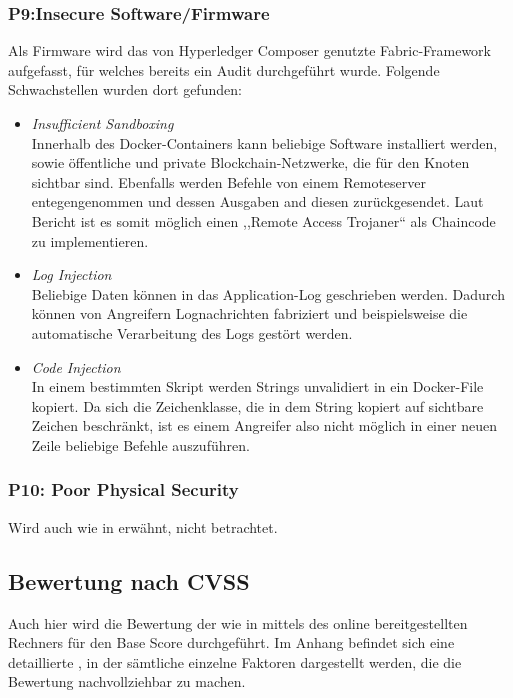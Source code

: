         \subsubsection*{P9:Insecure Software/Firmware}
            Als Firmware wird das von Hyperledger Composer genutzte Fabric-Framework aufgefasst, für welches bereits ein Audit\cite{Shaw2017} durchgeführt wurde. 
            Folgende Schwachstellen wurden dort gefunden:
            \begin{itemize}[leftmargin=0cm,label={}]
    	        \item \emph{Insufficient Sandboxing}\cite{Shaw2017}\label{vuln:fabric_sandbox}\\
    	            Innerhalb des Docker-Containers kann beliebige Software installiert werden, sowie öffentliche und private Blockchain-Netzwerke, die für den Knoten sichtbar sind. 
    	            Ebenfalls werden Befehle von einem Remoteserver entegengenommen und dessen Ausgaben and diesen zurückgesendet. 
    	            Laut Bericht ist es somit möglich einen ,,Remote Access Trojaner`` als Chaincode zu implementieren.
    	        \item \emph{Log Injection}\cite{Shaw2017}\label{vuln:fabric_log_injection}\\
    	            Beliebige Daten können in das Application-Log geschrieben werden.
    	            Dadurch können von Angreifern Lognachrichten fabriziert und beispielsweise die automatische Verarbeitung des Logs gestört werden. 
    	        \item \emph{Code Injection}\cite{Shaw2017}\label{vuln:fabric_code_injection}\\
    	            In einem bestimmten Skript werden Strings unvalidiert in ein Docker-File kopiert. 
    	            Da sich die Zeichenklasse, die in dem String kopiert auf sichtbare Zeichen beschränkt, ist es einem Angreifer also nicht möglich in einer neuen Zeile beliebige Befehle auszuführen.
            \end{itemize}
            
        \subsubsection*{P10: Poor Physical Security}
            Wird auch wie in  erwähnt, nicht betrachtet.
    
    \newpage
    \subsection{Bewertung nach CVSS}
    \label{sec:evaluation_cvss}
        Auch hier wird die Bewertung der  wie in  mittels des online bereitgestellten Rechners\cite{CvssCalc} für den Base Score durchgeführt. 
    	Im Anhang befindet sich eine detaillierte , in der sämtliche einzelne Faktoren dargestellt werden, die die Bewertung nachvollziehbar zu machen.
    
